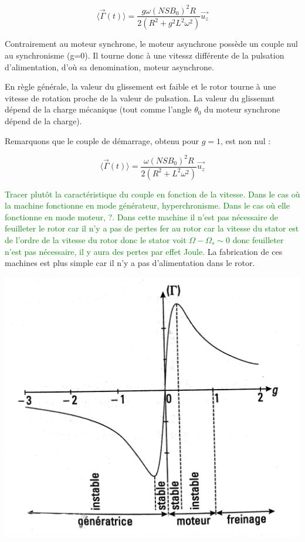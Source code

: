 \documentclass{article}
\begin{document}
\begin{equation}
     \langle \vec{\Gamma}(t) \rangle = \frac{g\omega (NSB_0)^2R}{2(R^2 + g^2L^2\omega^2)}\vec{u_z}
\end{equation}

Contrairement au moteur synchrone, le moteur asynchrone possède un couple nul au synchronisme (g=0). Il tourne donc à une vitessz différente de la pulsation d'alimentation, d'où sa denomination, moteur asynchrone.\medskip

En règle générale, la valeur du glissement est faible et le rotor tourne à une vitesse de rotation proche de la valeur de pulsation. La valeur du glissemnt dépend de la charge mécanique (tout comme l'angle $\theta_0$ du moteur synchrone dépend de la charge).\medskip

Remarquons que le couple de démarrage, obtenu pour $g=1$, est non nul :

\begin{equation}
    \langle \vec{\Gamma}(t) \rangle = \frac{\omega (NSB_0)^2R}{2(R^2 + L^2\omega^2)}\vec{u_z}
\end{equation}

\textcolor{green}{Tracer plutôt la caractéristique du couple en fonction de la vitesse. Dans le cas où la machine fonctionne en mode générateur, hyperchronisme. Dans le cas où elle fonctionne en mode moteur, ?. Dans cette machine il n'est pas nécessaire de feuilleter le rotor car il n'y a pas de pertes fer au rotor car la vitesse du stator est de l'ordre de la vitesse du rotor donc le stator voit $\Omega - \Omega_s \sim 0$ donc feuilleter n'est pas nécessaire, il y aura des pertes par effet Joule.} La fabrication de ces machines est plus simple car il n'y a pas d'alimentation dans le rotor.




\begin{center}
    \includegraphics[scale=0.12]{graphasync.jpg}
\end{center}
\end{document}
